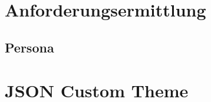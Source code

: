 {}
\printglossary[numberedsection,style=altlist,title=Begriffsdefinitionen]
\label{chap:Definitionen}

\chapter{Anforderungsermittlung}
\section{Persona}



%



%



\chapter{JSON Custom Theme}
